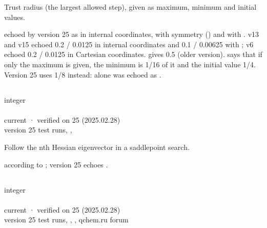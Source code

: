 \documentclass[letterpaper,10pt,english,openany,oneside]{sphinxmanual}
\begin{document}
\sphinxAtStartPar
Trust radius (the largest allowed step), given as maximum, minimum and initial values.

\sphinxAtStartPar
{} echoed by version 25 as  in internal coordinates, with
symmetry () and with . v13 and v15 echoed 0.2 / 0.0125 in internal coordinates and
0.1 / 0.00625 with ; v6 echoed 0.2 / 0.0125 in Cartesian coordinates.  gives 0.5
(older version).  says that if only the maximum is given, the minimum is 1/16 of it and the initial
value 1/4. Version 25 uses 1/8 instead:  alone was echoed as .


\subsection{}
\label{\detokenize{reference/optimize:follow}}\label{\detokenize{reference/optimize:optimize-follow}}
\ignorespaces 
\sphinxAtStartPar
{} integer\\
 \\
 current · verified on 25 (2025.02.28)\\
 version 25 test runs, , 

\sphinxAtStartPar
Follow the n\sphinxhyphen{}th Hessian eigenvector in a saddle\sphinxhyphen{}point search.

\sphinxAtStartPar
{}  according to ; version 25 echoes .

\sphinxAtStartPar
{} {\hyperref[\detokenize{reference/optimize:optimize-saddle}]{}}


\subsection{}
\label{\detokenize{reference/optimize:steps}}\label{\detokenize{reference/optimize:optimize-steps}}
\ignorespaces 
\sphinxAtStartPar
{} integer\\
 \\
 current · verified on 25 (2025.02.28)\\
 version 25 test runs, , , qchem.ru forum
\end{document}
